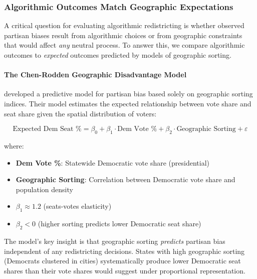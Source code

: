 
\subsubsection{Algorithmic Outcomes Match Geographic Expectations}
\label{sec:expected_seats}

A critical question for evaluating algorithmic redistricting is whether observed partisan biases result from algorithmic choices or from geographic constraints that would affect \textit{any} neutral process. To answer this, we compare algorithmic outcomes to \textit{expected} outcomes predicted by models of geographic sorting.

\paragraph{The Chen-Rodden Geographic Disadvantage Model}

\citet{chen2013} developed a predictive model for partisan bias based solely on geographic sorting indices. Their model estimates the expected relationship between vote share and seat share given the spatial distribution of voters:

\begin{equation}
\text{Expected Dem Seat \%} = \beta_0 + \beta_1 \cdot \text{Dem Vote \%} + \beta_2 \cdot \text{Geographic Sorting} + \varepsilon
\end{equation}

where:
\begin{itemize}
\item \textbf{Dem Vote \%}: Statewide Democratic vote share (presidential)
\item \textbf{Geographic Sorting}: Correlation between Democratic vote share and population density
\item $\beta_1 \approx 1.2$ (seats-votes elasticity)
\item $\beta_2 < 0$ (higher sorting predicts lower Democratic seat share)
\end{itemize}

The model's key insight is that geographic sorting \textit{predicts} partisan bias independent of any redistricting decisions. States with high geographic sorting (Democrats clustered in cities) systematically produce lower Democratic seat shares than their vote shares would suggest under proportional representation.

